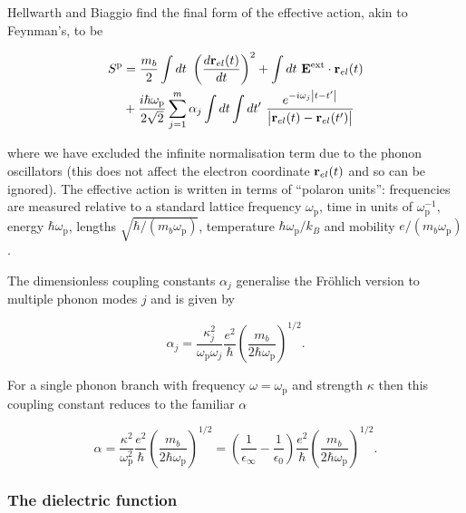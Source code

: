 Hellwarth and Biaggio find the final form of the effective action, akin to Feynman's, to be

\begin{equation}\label{eqn:HI_eff_action}
    \begin{aligned}
    S^{\text{p}} &= \frac{m_b}{2} \int dt\ \left( \frac{d\vb{r}_{el}(t)}{dt} \right)^2 + \int dt\ \vb{E}^{\text{ext}} \cdot \vb{r}_{el}(t) \\
    &+ \frac{i\hbar\omega_{\text{p}}}{2\sqrt{2}} \sum_{j = 1}^m \alpha_j \int dt \int dt'\ \frac{e^{-i\omega_j \abs{t-t'}}}{\abs{\vb{r}_{el}(t) - \vb{r}_{el}(t')}} 
    \end{aligned}
\end{equation}

where we have excluded the infinite normalisation term due to the phonon oscillators (this does not affect the electron coordinate $\vb{r}_{el}(t)$ and so can be ignored). The effective action is written in terms of ``polaron units'': frequencies are measured relative to a standard lattice frequency $\omega_{\text{p}}$, time in units of $\omega_{\text{p}}^{-1}$, energy $\hbar \omega_{\text{p}}$, lengths $\sqrt{\hbar/(m_b \omega_{\text{p}})}$, temperature $\hbar\omega_{\text{p}}/k_B$ and mobility $e/(m_b \omega_{\text{p}})$. 

The dimensionless coupling constants $\alpha_j$ generalise the Fr\"ohlich version to multiple phonon modes $j$ and is given by

\begin{equation}
    \alpha_j = \frac{\kappa_j^2}{\omega_{\text{p}} \omega_j} \frac{e^2}{\hbar} \left( \frac{m_b}{2 \hbar \omega_{\text{p}}} \right)^{1/2}.
\end{equation}

For a single phonon branch with frequency $\omega = \omega_{\text{p}}$ and strength $\kappa$ then this coupling constant reduces to the familiar $\alpha$

\begin{equation}
    \alpha = \frac{\kappa^2}{\omega^2_{\text{p}}} \frac{e^2}{\hbar} \left( \frac{m_b}{2\hbar\omega_{\text{p}}} \right)^{1/2} = \left( \frac{1}{\epsilon_\infty} - \frac{1}{\epsilon_0} \right) \frac{e^2}{\hbar} \left( \frac{m_b}{2\hbar\omega_{\text{p}}} \right)^{1/2}.
\end{equation}

\subsubsection{The dielectric function}
\label{subsubsec:2-3-3-4}

